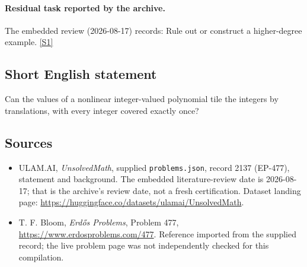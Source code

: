 \documentclass[11pt,a4paper]{article}
\newcommand{\sref}[2]{\hyperlink{source:#1:#2}{[S#2]}}
\begin{document}
\paragraph{Residual task reported by the archive.}

The embedded review (2026-08-17) records: Rule out or construct a higher-degree example. \sref{2137}{1}

\subsection{Short English statement}

Can the values of a nonlinear integer-valued polynomial tile the integers by translations, with every integer covered exactly once?

\subsection{Sources}

{\small

\begin{itemize}

\item[\hypertarget{source:2137:1}{S1}] ULAM.AI, \emph{UnsolvedMath}, supplied \texttt{problems.json}, record 2137 (EP-477), statement and background. The embedded literature-review date is 2026-08-17; that is the archive’s review date, not a fresh certification. Dataset landing page: \url{https://huggingface.co/datasets/ulamai/UnsolvedMath}.

\item[\hypertarget{source:2137:2}{S2}] T. F. Bloom, \emph{Erdős Problems}, Problem 477, \url{https://www.erdosproblems.com/477}. Reference imported from the supplied record; the live problem page was not independently checked for this compilation.

\end{itemize}

}

\label{end:2137}
\end{document}
